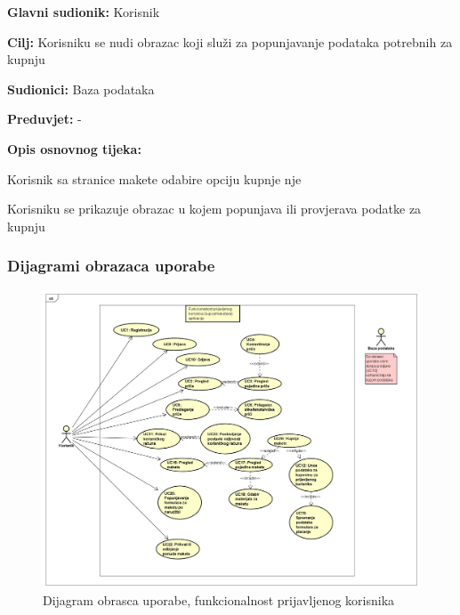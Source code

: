 			\noindent {}
			\begin{packed_item}
				
				\item \textbf{Glavni sudionik: }Korisnik
				\item  \textbf{Cilj:} Korisniku se nudi obrazac koji služi za popunjavanje podataka potrebnih za kupnju
				\item  \textbf{Sudionici:} Baza podataka
				\item  \textbf{Preduvjet:} -
				\item  \textbf{Opis osnovnog tijeka:}
				
				\item[] \begin{packed_enum}
					
					\item Korisnik sa stranice makete odabire opciju kupnje nje
					\item Korisniku se prikazuje obrazac u kojem popunjava ili provjerava podatke za kupnju
				\end{packed_enum}
			\end{packed_item}
					
				\subsubsection{Dijagrami obrazaca uporabe}
					
					\begin{figure}[H]
						\includegraphics[width=.9\linewidth]{slike/Funkcionalnost_prijavljenog_korisnika.PNG} %
						\caption{Dijagram obrasca uporabe, funkcionalnost prijavljenog korisnika}
						\label{fig:obrupo1} %
					\end{figure}

